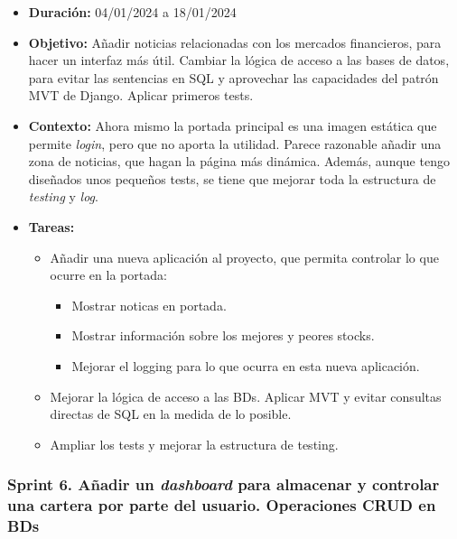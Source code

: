 \begin{itemize}
\item  
\textbf{Duración:} 04/01/2024 a 18/01/2024

\item
\textbf{Objetivo:} Añadir noticias relacionadas con los mercados financieros, para hacer un interfaz más útil. Cambiar la lógica de acceso a las bases de datos, para evitar las sentencias en SQL y aprovechar las capacidades del patrón MVT\citep{online:django_MVT_2} de Django. Aplicar primeros tests. 

\item
\textbf{Contexto:} Ahora mismo la portada principal es una imagen estática que permite \emph{login}, pero que no aporta la utilidad. Parece razonable añadir una zona de noticias, que hagan la página más dinámica. Además, aunque tengo diseñados unos pequeños tests, se tiene que mejorar toda la estructura de \emph{testing} y \emph{log}. 

\item
\textbf{Tareas:}
	\begin{itemize}
	\tightlist
	\item 
	Añadir una nueva aplicación al proyecto, que permita controlar lo que ocurre en la portada:
		\begin{itemize}
		\tightlist
		\item
		Mostrar noticas en portada.
		\item
		Mostrar información sobre los mejores y peores stocks.
		\item
		Mejorar el logging para lo que ocurra en esta nueva aplicación.
		\end{itemize}
	\item
	Mejorar la lógica de acceso a las BDs. Aplicar MVT y evitar consultas directas de SQL en la medida de lo posible.
	\item 	
	Ampliar los tests y mejorar la estructura de testing. 
  	\end{itemize}
\end{itemize}


\subsubsection{Sprint 6. Añadir un \emph{dashboard} para almacenar y controlar una cartera por parte del usuario. Operaciones CRUD en BDs}


